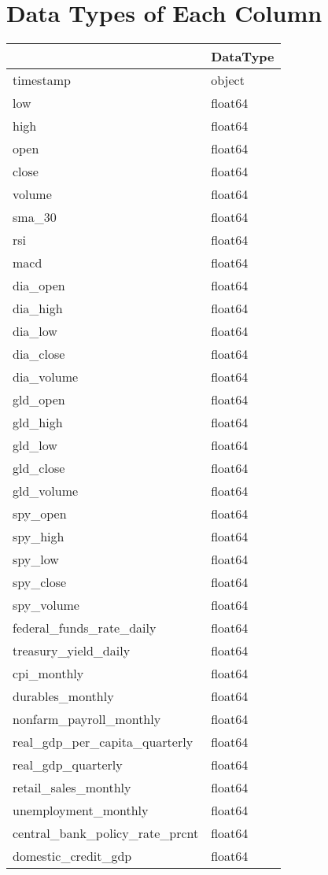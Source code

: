 \section*{Data Types of Each Column}
\begin{tabular}{ll}
\toprule
 & DataType \\
\midrule
timestamp & object \\
low & float64 \\
high & float64 \\
open & float64 \\
close & float64 \\
volume & float64 \\
sma_30 & float64 \\
rsi & float64 \\
macd & float64 \\
dia_open & float64 \\
dia_high & float64 \\
dia_low & float64 \\
dia_close & float64 \\
dia_volume & float64 \\
gld_open & float64 \\
gld_high & float64 \\
gld_low & float64 \\
gld_close & float64 \\
gld_volume & float64 \\
spy_open & float64 \\
spy_high & float64 \\
spy_low & float64 \\
spy_close & float64 \\
spy_volume & float64 \\
federal_funds_rate_daily & float64 \\
treasury_yield_daily & float64 \\
cpi_monthly & float64 \\
durables_monthly & float64 \\
nonfarm_payroll_monthly & float64 \\
real_gdp_per_capita_quarterly & float64 \\
real_gdp_quarterly & float64 \\
retail_sales_monthly & float64 \\
unemployment_monthly & float64 \\
central_bank_policy_rate_prcnt & float64 \\
domestic_credit_gdp & float64 \\

\end{tabular}
